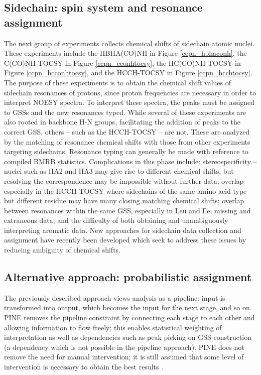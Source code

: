 \subsection*{Sidechain: spin system and resonance assignment}
The next group of experiments collects chemical shifts of sidechain atomic nuclei.  
These experiments include 
the HBHA(CO)NH \cite{hbhaconh} in Figure \ref{ccpn_hbhaconh}, 
the C(CO)NH-TOCSY \cite{cconhtocsy} in Figure \ref{ccpn_cconhtocsy}, 
the HC(CO)NH-TOCSY \cite{hcconhtocsy} in Figure \ref{ccpn_hcconhtocsy}, 
and the HCCH-TOCSY \cite{hcchtocsy} in Figure \ref{ccpn_hcchtocsy}.  
The purpose of these experiments is to 
obtain the chemical shift values of sidechain resonances of protons, since 
proton frequencies are necessary in order to interpret NOESY spectra.  To 
interpret these spectra, the peaks must be assigned to GSSs and the new 
resonances typed.  While several of these experiments 
are also rooted in backbone H-N groups, facilitating the addition of peaks 
to the correct GSS, others -- such as the HCCH-TOCSY -- are not.  These are 
analyzed by the matching of resonance chemical shifts with those from other 
experiments targeting sidechains.  Resonance typing can generally 
be made with reference to compiled BMRB statistics.  Complications in this 
phase include: stereospecificity -- nuclei such as HA2 and HA3 may give rise 
to different chemical shifts, but resolving the correspondence may be 
impossible without further data; overlap -- especially in the HCCH-TOCSY 
where sidechains of the same amino acid type but different residue may have 
many closing matching chemical shifts; overlap between resonances within the 
same GSS, especially in Leu and Ile; missing and extraneous data; and the 
difficulty of both obtaining and unambiguously interpreting aromatic data.  
New approaches for sidechain data collection and assignment have recently 
been developed \cite{mobli2010non, hiller2008apsy} which seek to address 
these issues by reducing ambiguity of chemical shifts.

\subsection*{Alternative approach: probabilistic assignment}
The previously described approach views analysis as a pipeline: input is 
transformed into output, which becomes the input for the next stage, and so on.  
PINE \cite{pine} removes the pipeline constraint by connecting each stage to 
each other and allowing information to flow freely; this enables statistical 
weighting of interpretation as well as dependencies such as peak picking 
on GSS construction (a dependency which is not possible in the pipeline 
approach).  PINE does not remove the need for manual intervention; it is
still assumed that some level of intervention is necessary to obtain the
best results \cite{pine}.


